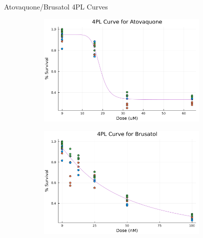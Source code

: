 \documentclass{beamer}
\begin{document}
\begin{frame}{Atovaquone/Brusatol 4PL Curves}
    \begin{figure}
        \centering
        \begin{subfigure}{0.5\textwidth}
            \centering
            \includegraphics[width=0.9\textwidth, height = 0.6\textheight]{figs/ato4pl.png}
        \end{subfigure}%
        \begin{subfigure}{0.5\textwidth}
            \centering
            \includegraphics[width=0.9\textwidth, height = 0.6\textheight]{figs/bru4pl.png}
        \end{subfigure}
    \end{figure}
\end{frame}
\end{document}
